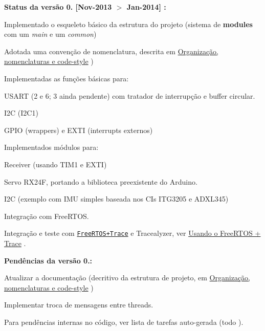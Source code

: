 {\bfseries Status da versão 0. \mbox{[}Nov-\/2013 $>$ Jan-\/2014\mbox{]} \+:}
\begin{DoxyItemize}
\item Implementado o esqueleto básico da estrutura do projeto (sistema de {\bfseries modules} com um {\itshape main} e um {\itshape common})
\item Adotada uma convenção de nomenclatura, descrita em \hyperlink{page_naming}{Organização, nomenclaturas e code-\/style} )
\item Implementadas as funções básicas para\+:
\begin{DoxyItemize}
\item U\+S\+A\+RT (2 e 6; 3 ainda pendente) com tratador de interrupção e buffer circular.
\item I2C (I2\+C1)
\item G\+P\+IO (wrappers) e E\+X\+TI (interrupts externos)
\end{DoxyItemize}
\item Implementados módulos para\+:
\begin{DoxyItemize}
\item Receiver (usando T\+I\+M1 e E\+X\+TI)
\item Servo R\+X24F, portando a biblioteca preexistente do Arduino.
\item I2C (exemplo com I\+MU simples baseada nos C\+Is I\+T\+G3205 e A\+D\+X\+L345)
\end{DoxyItemize}
\item Integração com Free\+R\+T\+OS.
\item Integração e teste com \href{http://www.freertos.org/FreeRTOS-Plus/FreeRTOS_Plus_Trace/FreeRTOS_Plus_Trace.shtml}{\tt Free\+R\+T\+O\+S+\+Trace} e Tracealyzer, ver \hyperlink{page_freertosplustrace}{Usando o Free\+R\+T\+OS + Trace} .
\end{DoxyItemize}

{\bfseries Pendências da versão 0.\+:}
\begin{DoxyItemize}
\item Atualizar a documentação (decritivo da estrutura de projeto, em \hyperlink{page_naming}{Organização, nomenclaturas e code-\/style} )
\item Implementar troca de mensagens entre threads.
\end{DoxyItemize}

Para pendências internas no código, ver lista de tarefas auto-\/gerada (todo ). 
